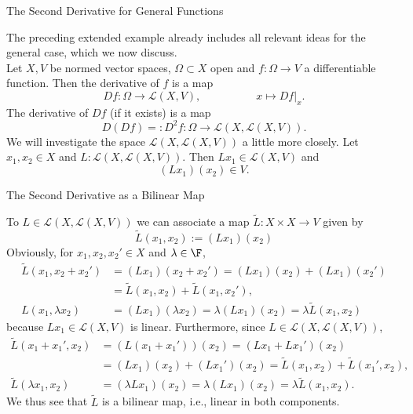 \documentclass[smaller,hyperref={CJKbookmarks=true}]{beamer}
\begin{document}
\begin{frame}[t]{The Second Derivative for General Functions}
\begin{spacing}{1}
The preceding extended example already includes all relevant ideas for the
general case, which we now discuss.\\
Let $X,V$ be normed vector spaces, $\Omega\subset X$ open and $f:\Omega\to V$ a  dif{}ferentiable function. Then the derivative of $f$ is a map
\begin{equation}\label{2.5.4}
Df:\Omega\to\mathcal{L}(X,V),\qquad\qquad\quad
x\mapsto Df|_x.
\end{equation}
The derivative of $Df$ (if it exists) is a map
\[D(Df)=:D^2f:\Omega\to\mathcal{L}(X,\mathcal{L}
(X,V)).\]
We will investigate the space $\mathcal{L}(X,\mathcal{L}(X,V))$ a little more closely. Let $x_1,x_2\in X$ and $L:\mathcal{L}(X,\mathcal{L}(X,V))$. Then $Lx_1\in\mathcal{L}(X,V)$ and
\[(Lx_1)(x_2)\in V.\]
\end{spacing}
\end{frame}
\begin{frame}[t]{The Second Derivative as a Bilinear Map}
\begin{spacing}{0.7}
To $L\in\mathcal{L}(X,\mathcal{L}(X,V))$ we can associate a map $\widetilde{L}:X\times X\to V$ given by
\begin{equation}\label{2.5.5}
\widetilde{L}(x_1,x_2):=(Lx_1)(x_2)
\end{equation}
Obviously, for $x_1,x_2,x_2'\in X$ and $\lambda\in\F$,
\begin{align*}
  \widetilde{L}(x_1,x_2+x_2') &=(Lx_1)(x_2+x_2')=(Lx_1)(x_2)+(Lx_1)(x_2') \\
   &=\widetilde{L}(x_1,x_2)+\widetilde{L}(x_1,x_2'), \\
  L(x_1,\lambda x_2) &=(Lx_1)(\lambda x_2)=\lambda(Lx_1)(x_2)=\lambda\widetilde{L}(x_1,x_2)
\end{align*}
because $Lx_1\in\mathcal{L}(X,V)$ is linear. Furthermore, since $L\in\mathcal{L}(X,\mathcal{L}(X,V))$,
\begin{align*}
  \widetilde{L}(x_1+x_1',x_2) &=(L(x_1+x_1'))(x_2)=(Lx_1+Lx_1')(x_2) \\
   &=(Lx_1)(x_2)+(Lx_1')(x_2)=\widetilde{L}(x_1,x_2)+\widetilde{L}(x_1',x_2), \\
  \widetilde{L}(\lambda x_1, x_2) &=(\lambda Lx_1)(x_2)=\lambda(Lx_1)(x_2)=\lambda\widetilde{L}(x_1,x_2).
\end{align*}
We thus see that $\widetilde{L}$ is a bilinear map, i.e., linear in both components.
\end{spacing}
\end{frame}
\end{document}
